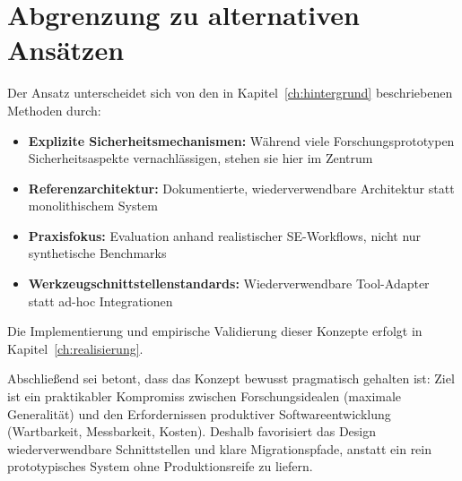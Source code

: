 \section{Abgrenzung zu alternativen Ansätzen}

Der Ansatz unterscheidet sich von den in Kapitel~\ref{ch:hintergrund} beschriebenen Methoden durch:

\begin{sloppypar}
\begin{itemize}
  \item \textbf{Explizite Sicherheitsmechanismen:} Während viele Forschungsprototypen Sicherheitsaspekte vernachlässigen, stehen sie hier im Zentrum
  
  \item \textbf{Referenzarchitektur:} Dokumentierte, wiederverwendbare Architektur statt monolithischem System
  
  \item \textbf{Praxisfokus:} Evaluation anhand realistischer SE-Workflows, nicht nur synthetische Benchmarks
  
  \item \textbf{Werkzeugschnittstellenstandards:} Wiederverwendbare Tool-Adapter statt ad-hoc Integrationen
\end{itemize}
\end{sloppypar}

Die Implementierung und empirische Validierung dieser Konzepte erfolgt in Kapitel~\ref{ch:realisierung}.

Abschließend sei betont, dass das Konzept bewusst pragmatisch gehalten ist: Ziel ist ein praktikabler Kompromiss zwischen Forschungsidealen (maximale Generalität) und den Erfordernissen produktiver Softwareentwicklung (Wartbarkeit, Messbarkeit, Kosten). Deshalb favorisiert das Design wiederverwendbare Schnittstellen und klare Migrationspfade, anstatt ein rein prototypisches System ohne Produktionsreife zu liefern.
